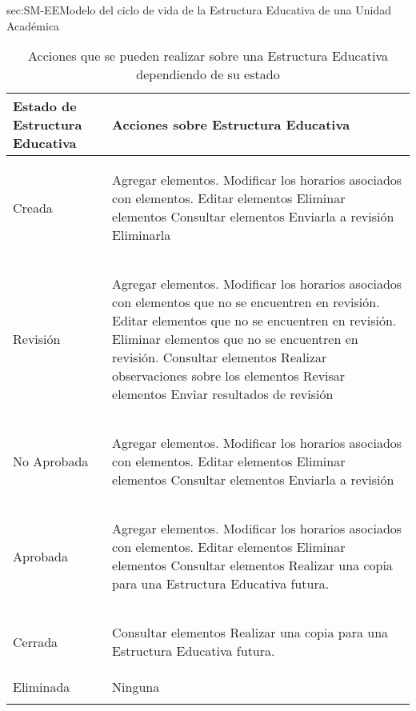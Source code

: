 \begin{Maquina}{sec:SM-EE}{Modelo del ciclo de vida de la Estructura Educativa de una Unidad Académica}
\begin{description}
\end{description}


\begin{longtable}{| p{} | p{} |}
	\hline  
	\label{SM:estadosEE} 
	{\bf Estado de Estructura Educativa}  & {\bf Acciones sobre Estructura Educativa}\\
	\endfirsthead
	\hline
	Creada & 
	\begin{Titemize} 
		\Titem Agregar elementos.
		\Titem Modificar los horarios asociados con elementos.
		\Titem Editar elementos
		\Titem Eliminar elementos
		\Titem Consultar elementos
		\Titem Enviarla a revisión
		\Titem Eliminarla
	\end{Titemize}\\ 
	\hline
	Revisión &  
	\begin{Titemize} 
		\Titem Agregar elementos.
		\Titem Modificar los horarios asociados con elementos que no se encuentren en revisión.
		\Titem Editar elementos que no se encuentren en revisión.
		\Titem Eliminar elementos que no se encuentren en revisión.
		\Titem Consultar elementos
		\Titem Realizar observaciones sobre los elementos
		\Titem Revisar elementos
		\Titem Enviar resultados de revisión
	\end{Titemize}\\ 
	\hline
	No Aprobada & 
	\begin{Titemize} 
		\Titem Agregar elementos.
		\Titem Modificar los horarios asociados con elementos.
		\Titem Editar elementos
		\Titem Eliminar elementos
		\Titem Consultar elementos
		\Titem Enviarla a revisión
	\end{Titemize}\\
	\hline
	Aprobada & 
	\begin{Titemize} 
		\Titem Agregar elementos.
		\Titem Modificar los horarios asociados con elementos.
		\Titem Editar elementos
		\Titem Eliminar elementos
		\Titem Consultar elementos
		\Titem Realizar una copia para una Estructura Educativa futura.
	\end{Titemize}\\ 
	\hline
	Cerrada  & 
	\begin{Titemize} 
		\Titem Consultar elementos
		\Titem Realizar una copia para una Estructura Educativa futura.
	\end{Titemize}\\ 
	\hline
	Eliminada & Ninguna\\ 
	\hline
	\caption{Acciones que se pueden realizar sobre una Estructura Educativa dependiendo de su estado}
\end{longtable}
\end{Maquina}

